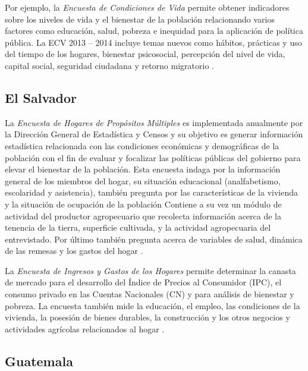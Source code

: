 \documentclass[12pt,spanish,]{book}
\begin{document}
Por ejemplo, la \emph{Encuesta de Condiciones de Vida} permite obtener indicadores sobre los niveles de vida y el bienestar de la población relacionando varios factores como educación, salud, pobreza e inequidad para la aplicación de política pública. La ECV 2013 -- 2014 incluye temas nuevos como hábitos, prácticas y uso del tiempo de los hogares, bienestar psicosocial, percepción del nivel de vida, capital social, seguridad ciudadana y retorno migratorio \autocite{INEC2-EC}.

\hypertarget{el-salvador}{%
\subsection*{El Salvador}\label{el-salvador}}

La \emph{Encuesta de Hogares de Propósitos Múltiples} es implementada anualmente por la Dirección General de Estadística y Censos y su objetivo es generar información estadística relacionada con las condiciones económicas y demográficas de la población con el fin de evaluar y focalizar las políticas públicas del gobierno para elevar el bienestar de la población. Esta encuesta indaga por la información general de los miembros del hogar, su situación educacional (analfabetismo, escolaridad y asistencia), también pregunta por las características de la vivienda y la situación de ocupación de la población Contiene a su vez un módulo de actividad del productor agropecuario que recolecta información acerca de la tenencia de la tierra, superficie cultivada, y la actividad agropecuaria del entrevistado. Por último también pregunta acerca de variables de salud, dinámica de las remesas y los gastos del hogar \autocite{DIGESTYC-SV}.

La \emph{Encuesta de Ingresos y Gastos de los Hogares} permite determinar la canasta de mercado para el desarrollo del Índice de Precios al Consumidor (IPC), el consumo privado en las Cuentas Nacionales (CN) y para análisis de bienestar y pobreza. La encuesta también mide la educación, el empleo, las condiciones de la vivienda, la posesión de bienes durables, la construcción y los otros negocios y actividades agrícolas relacionados al hogar \autocite{DIGESTYC2-SV}.

\hypertarget{guatemala}{%
\subsection*{Guatemala}\label{guatemala}}
\end{document}
